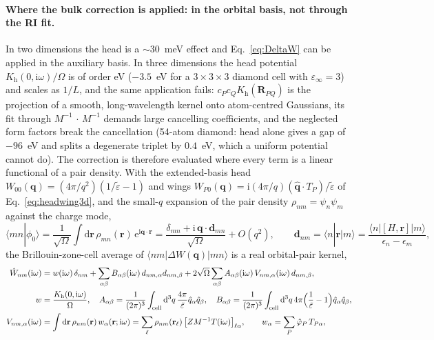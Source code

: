 \documentclass[11pt,a4paper]{article}
\newcommand{\br}{\mathbf{r}}
\newcommand{\bR}{\mathbf{R}}
\newcommand{\bq}{\mathbf{q}}
\newcommand{\qhat}{\hat{\mathbf{q}}}
\newcommand{\dd}{\mathrm{d}}
\newcommand{\ii}{\mathrm{i}}
\newcommand{\ee}{\mathrm{e}}
\newcommand{\head}{\mathrm{h}}
\begin{document}
\paragraph{Where the bulk correction is applied: in the orbital basis, not through the RI fit.}
In two dimensions the head is a $\sim30$~meV effect and Eq.~\eqref{eq:DeltaW} can be applied
in the auxiliary basis. In three dimensions the head potential $K_\head(0,\ii\omega)/\Omega$ is
of order eV ($-3.5$~eV for a $3\times3\times3$ diamond cell with $\varepsilon_\infty = 3$) and
scales as $1/L$, and the same application fails: $c_P c_Q K_\head(\bR_{PQ})$ is the projection
of a smooth, long-wavelength kernel onto atom-centred Gaussians, its fit through
$M^{-1}\,\cdot\,M^{-1}$ demands large cancelling coefficients, and the neglected form factors
break the cancellation (54-atom diamond: head alone gives a gap of $-96$~eV and splits a
degenerate triplet by $0.4$~eV, which a uniform potential cannot do). The correction is
therefore evaluated where every term is a linear functional of a pair density. With the
extended-basis head $W_{00}(\bq) = (4\pi/q^2)(1/\tilde\varepsilon-1)$ and wings
$W_{P0}(\bq) = \ii(4\pi/q)(\qhat\cdot T_P)/\tilde\varepsilon$ of Eq.~\eqref{eq:headwing3d},
and the small-$q$ expansion of the pair density $\rho_{nm} = \psi_n\psi_m$ against the charge
mode,
\begin{equation}
  \langle mn|\phi_0\rangle = \frac{1}{\sqrt\Omega}\int\dd\br\,\rho_{mn}(\br)\,\ee^{\ii\bq\cdot\br}
  = \frac{\delta_{mn} + \ii\,\bq\cdot\mathbf d_{mn}}{\sqrt\Omega} + O(q^2),\qquad
  \mathbf d_{nm} = \langle n|\br|m\rangle = \frac{\langle n|[H,\br]|m\rangle}{\epsilon_n-\epsilon_m},
  \label{eq:pairphase}
\end{equation}
the Brillouin-zone-cell average of $\langle nm|\Delta W(\bq)|mn\rangle$ is a real orbital-pair
kernel,
\begin{align}
  \hat W_{nm}(\ii\omega) &= w(\ii\omega)\,\delta_{nm}
  + \sum_{\alpha\beta} B_{\alpha\beta}(\ii\omega)\, d_{nm,\alpha} d_{nm,\beta}
  + 2\sqrt\Omega\sum_{\alpha\beta} A_{\alpha\beta}(\ii\omega)\, V_{nm,\alpha}(\ii\omega)\, d_{nm,\beta},
  \label{eq:What}\\
  w &= \frac{K_\head(0,\ii\omega)}{\Omega},\quad
  A_{\alpha\beta} = \frac{1}{(2\pi)^3}\int_{\rm cell}\dd^3q\,\frac{4\pi}{\tilde\varepsilon}\hat q_\alpha\hat q_\beta,\quad
  B_{\alpha\beta} = \frac{1}{(2\pi)^3}\int_{\rm cell}\dd^3q\,4\pi\Big(\frac1{\tilde\varepsilon}-1\Big)\hat q_\alpha\hat q_\beta,
  \label{eq:AB}\\
  V_{nm,\alpha}(\ii\omega) &= \int\dd\br\,\rho_{nm}(\br)\,w_\alpha(\br;\ii\omega)
  = \sum_\ell \rho_{nm}(\br_\ell)\,\big[Z M^{-1} T(\ii\omega)\big]_{\ell\alpha},\qquad
  w_\alpha = \sum_P \hat\varphi_P\,T_{P\alpha},
  \label{eq:Vnm}
\end{align}
\end{document}
